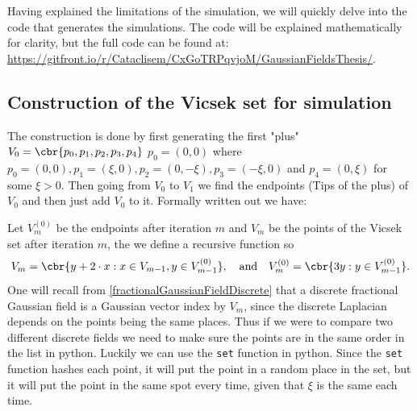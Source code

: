 Having explained the limitations of the simulation, we will quickly delve into the code that generates the simulations. The code will be explained mathematically for clarity, but the full code can be found at: \url{https://gitfront.io/r/Cataclisem/CxGoTRPqvjoM/GaussianFieldsThesis/}.

\subsection{Construction of the Vicsek set for simulation}
The construction is done by first generating the first "plus" $V_0 = \cbr{p_0, p_1, p_2, p_3, p_4}$ $p_0=(0,0)$ where $p_0 = (0,0), p_1=(\xi, 0), p_2 = (0, -\xi), p_3 = (-\xi, 0)$ and $p_4 = (0, \xi)$ for some $\xi > 0$. Then going from $V_0$ to $V_1$ we find the endpoints (Tips of the plus) of $V_0$ and then just add $V_0$ to it. Formally written out we have:

Let $V^{(0)}_{m}$ be the endpoints after iteration $m$ and $V_m$ be the points of the Vicsek set after iteration $m$, the we define a recursive function so
\begin{equation}
	V_m = \cbr{y + 2\cdot x : x \in V_{m-1}, y \in V^{(0)}_{m-1}}, \quad \text{and} \quad V^{(0)}_m = \cbr{3y : y \in V^{(0)}_{m-1}}.
\end{equation}
One will recall from \cref{fractionalGaussianFieldDiscrete} that a discrete fractional Gaussian field is a Gaussian vector index by $V_m$, since the discrete Laplacian depends on the points being the same places. Thus if we were to compare two different discrete fields we need to make sure the points are in the same order in the list in python. Luckily we can use the \verb*|set| function in python. Since the \verb*|set| function hashes each point, it will put the point in a random place in the set, but it will put the point in the same spot every time, given that $\xi$ is the same each time. 

